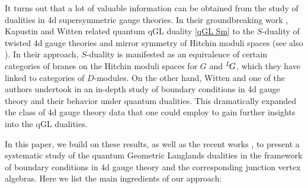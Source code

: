 \documentclass[11pt,reqno]{amsart}
\theoremstyle{plain}
\numberwithin{equation}{section}
\def\neg{\negthinspace}
\def\LG{{}^L\neg G}
\theoremstyle{definition}
\begin{document}
It turns out that a lot of valuable information can be obtained from
the study of dualities in 4d supersymmetric gauge theories. In their
groundbreaking work \cite{KW}, Kapustin and Witten related quantum qGL
duality \eqref{qGL Sm} to the $S$-duality of twisted 4d gauge theories
and mirror symmetry of Hitchin moduli spaces (see also
\cite{Kapustin,Witten}). In their approach, $S$-duality is manifested
as an equivalence of certain categories of branes on the Hitchin
moduli spaces for $G$ and $\LG$, which they have linked to categories
of $D$-modules. On the other hand, Witten and one of the authors
undertook in \cite{GW1,GW2} an in-depth study of boundary conditions
in 4d gauge theory and their behavior under quantum dualities. This
dramatically expanded the class of 4d gauge theory data that one could
employ to gain further insights into the qGL dualities.

In this paper, we build on these results, as well as the recent works
\cite{Ga1,Ga2,GR,CG}, to present a systematic study of the quantum
Geometric Langlands dualities in the framework of boundary conditions
in 4d gauge theory and the corresponding junction vertex
algebras. Here we list the main ingredients of our approach:

\bigskip
\end{document}
